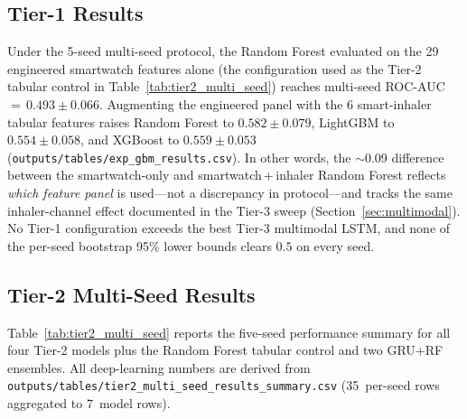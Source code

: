\documentclass[11pt,a4paper]{article}
\begin{document}
\subsection{Tier-1 Results}

Under the 5-seed multi-seed protocol, the Random Forest evaluated on the
29 engineered smartwatch features alone (the configuration used as the
Tier-2 tabular control in Table~\ref{tab:tier2_multi_seed}) reaches
multi-seed ROC-AUC\,$=\,0.493\pm0.066$.  Augmenting the engineered
panel with the 6 smart-inhaler tabular features raises Random Forest to
$0.582\pm0.079$, LightGBM to $0.554\pm0.058$, and XGBoost to
$0.559\pm0.053$ (\texttt{outputs/tables/exp\_gbm\_results.csv}).  In
other words, the $\sim$0.09 difference between the smartwatch-only and
smartwatch\,+\,inhaler Random Forest reflects \emph{which feature panel}
is used---not a discrepancy in protocol---and tracks the same
inhaler-channel effect documented in the Tier-3 sweep
(Section~\ref{sec:multimodal}).  No Tier-1 configuration exceeds the
best Tier-3 multimodal LSTM, and none of the per-seed bootstrap
95\% lower bounds clears $0.5$ on every seed.

\subsection{Tier-2 Multi-Seed Results}

Table~\ref{tab:tier2_multi_seed} reports the five-seed performance summary
for all four Tier-2 models plus the Random Forest tabular control and two
GRU+RF ensembles.  All deep-learning numbers are derived from
\texttt{outputs/tables/tier2\_multi\_seed\_results\_summary.csv}
(35~per-seed rows aggregated to 7~model rows).
\end{document}
